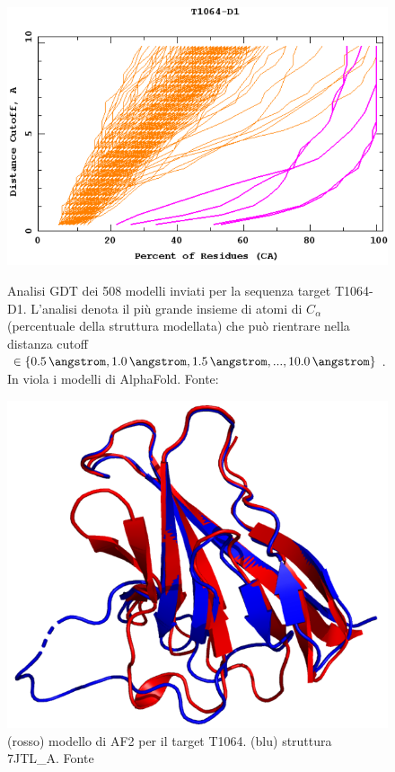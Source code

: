 \begin{figure}[!htb]
	\centering
	\includegraphics[scale=0.3]{images/t1064-af2.png}
	\caption{Analisi GDT dei 508 modelli inviati per la sequenza target T1064-D1. L'analisi denota il più grande insieme di atomi di $C_{\alpha}$ (percentuale della struttura modellata) che può rientrare nella distanza cutoff $ \in \{ 0.5\, \angstrom, 1.0\, \angstrom, 1.5\, \angstrom, ... , 10.0\, \angstrom \} $. In viola i modelli di AlphaFold. Fonte: \cite{CaspRes}}
	\label{fig:t1064-chart}
	\endminipage\hfill
	\centering
	\includegraphics[scale=0.3]{images/t1064_model.png}
	\caption{(rosso) modello di AF2 per il target T1064. (blu) struttura 7JTL\_A. Fonte \cite{blopigAF}}
	\label{fig:t1064-afmodel}
	\endminipage\hfill
\end{figure}

